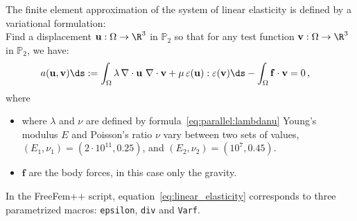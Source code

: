 The finite element approximation of the system of linear elasticity is defined by a variational formulation:\\
Find a displacement $\mathbf{u}:\Omega\rightarrow \R^3$ in ${\mathbb P}_2$ so that for any test function $\mathbf{v}:\Omega\rightarrow \R^3$  in ${\mathbb P}_2$, we have:
\begin{align}
\label{eq:linear_elasticity}
a(\mathbf{u}, \mathbf{v}) &\ds := \int_\Omega \lambda\, \nabla \cdot \mathbf{u}\ \nabla \cdot \mathbf{v} + \mu\, \varepsilon(\mathbf{u}) : \varepsilon(\mathbf{v}) 
\ds - \int_\Omega \mathbf{f} \cdot \mathbf{v} = 0\,,
\end{align}
where
\begin{itemize}
\item where $\lambda$ and $\nu$ are defined by formula~\eqref{eq:parallel:lambdanu} Young's modulus $E$ and Poisson's ratio $\nu$ vary between two sets of values, $(E_1, \nu_1) = (2 \cdot 10^{11}, 0.25)$, and $(E_2, \nu_2) = (10^7, 0.45)$.
\item $\mathbf{f}$ are the body forces, in this case only the gravity. 
\end{itemize}
In the FreeFem++ script, equation~\eqref{eq:linear_elasticity} corresponds to three parametrized macros: {\tt epsilon}, {\tt div} and {\tt Varf}.  
\vspace{0.5cm}


